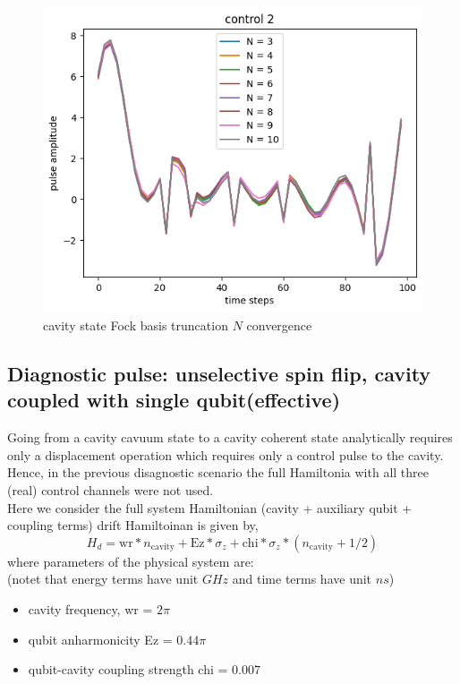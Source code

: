 \documentclass[12pt]{article}
\begin{document}
\begin{figure}[H]
    \centering
    \includegraphics[width=0.95\linewidth]{check_convergence_control2.png}
    \caption{cavity state Fock basis truncation $N$ convergence}
    \label{fig:check_convergence_control2}
\end{figure}

\subsection{Diagnostic pulse: unselective spin flip, cavity coupled with single qubit(effective)}
Going from a cavity cavuum state to a cavity coherent state analytically requires only a displacement operation
which requires only a control pulse to the cavity. Hence, in the previous disagnostic scenario the full Hamiltonia
with all three (real) control channels were not used.
\\
Here we consider the full system Hamiltonian (cavity + auxiliary qubit + coupling terms)
drift Hamiltoinan is given by, 
\begin{equation}
    H_d = \text{wr} * n_{\text{cavity}} + \text{Ez} * \sigma_z + \text{chi} * \sigma_z * (n_{\text{cavity}} + 1/2 )    
\end{equation}
where parameters of the physical system are:
\\
(notet that energy terms have unit $GHz$ and time terms have unit $ns$)
\begin{itemize}
    \item cavity frequency, wr = $2 \pi$
    \item qubit anharmonicity Ez = $0.44 \pi$
    \item qubit-cavity coupling strength chi = $0.007$
\end{itemize}
\end{document}
